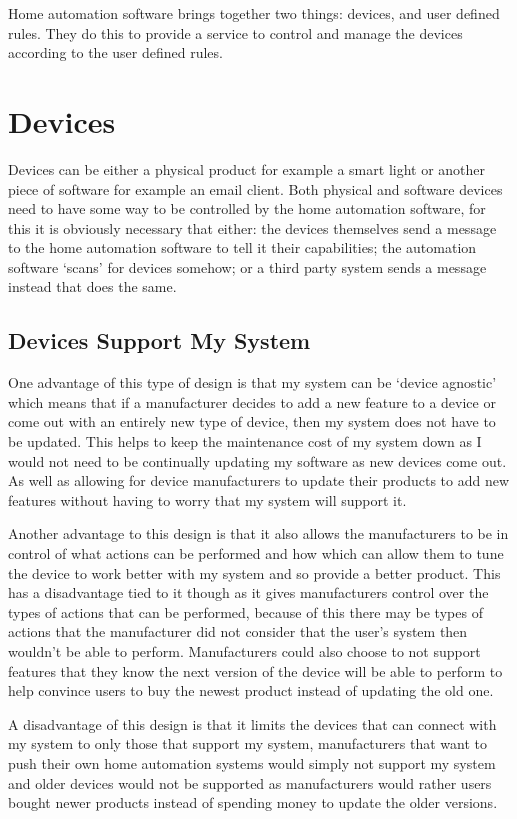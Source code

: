 Home automation software brings together two things: devices, and user defined
rules. They do this to provide a service to control and manage the devices
according to the user defined rules.

\section{Devices}
Devices can be either a physical product for example a smart light or another
piece of software for example an email client. Both physical and software
devices need to have some way to be controlled by the home automation software,
for this it is obviously necessary that either: the devices themselves send a
message to the home automation software to tell it their capabilities; the
automation software `scans' for devices somehow; or a third party system sends a
message instead that does the same.

\subsection{Devices Support My System}
One advantage of this type of design is that my system can be `device agnostic'
which means that if a manufacturer decides to add a new feature to a device or
come out with an entirely new type of device, then my system does not have to be
updated. This helps to keep the maintenance cost of my system down as I would
not need to be continually updating my software as new devices come out. As well
as allowing for device manufacturers to update their products to add new
features without having to worry that my system will support it.

Another advantage to this design is that it also allows the manufacturers to be
in control of what actions can be performed and how which can allow them to tune
the device to work better with my system and so provide a better product. This
has a disadvantage tied to it though as it gives manufacturers control over the
types of actions that can be performed, because of this there may be types of
actions that the manufacturer did not consider that the user's system then
wouldn't be able to perform. Manufacturers could also choose to not support
features that they know the next version of the device will be able to perform
to help convince users to buy the newest product instead of updating the old
one.

A disadvantage of this design is that it limits the devices that can connect
with my system to only those that support my system, manufacturers that want to
push their own home automation systems would simply not support my system and
older devices would not be supported as manufacturers would rather users bought
newer products instead of spending money to update the older versions.

